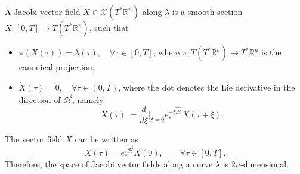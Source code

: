 \documentclass[reqno]{amsart}
\theoremstyle{plain}
\theoremstyle{definition}
\theoremstyle{remark}
\begin{document}
		A Jacobi vector field $X\in\mathcal{X}(T^*\mathbb{R}^n)$ along $\lambda$ is a smooth section $X:[0,T]\to T(T^*\mathbb{R}^n)$, such that
			\begin{itemize}
				\item $\pi(X(\tau))=\lambda(\tau),\quad \forall \tau\in[0,T]$, where $\pi:T(T^*\mathbb{R}^n)\to T^*\mathbb{R}^n$ is the canonical projection,
				\item $\dot{X}(\tau)=0,\quad \forall \tau\in(0,T)$, where the dot denotes the Lie derivative in the direction of $\overrightarrow{\mathcal{H}}$, namely
				\begin{equation}
					\dot{X}(\tau):=\frac{d}{d\xi}\bigg|_{\xi=0}e_{*}^{-\xi\overrightarrow{\mathcal{H}}}X(\tau+\xi).
				\end{equation}
			\end{itemize}
		The vector field $X$ can be written as 
		\begin{equation}
            X(\tau)=e^{\tau\overrightarrow{\mathcal{H}}}_{*}X(0),\qquad\forall \tau\in [0,T].
		\end{equation}
		Therefore, the space of Jacobi vector fields along a curve $\lambda$ is $2n$-dimensional.
        
\end{document}
